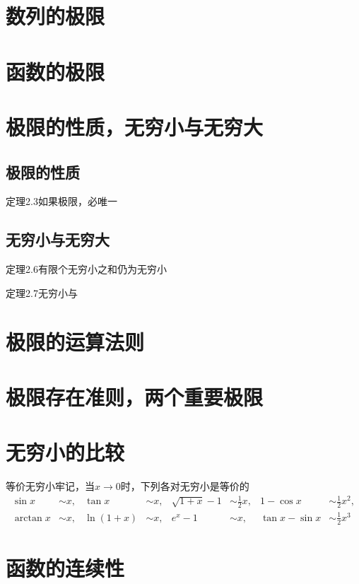 
\section{数列的极限}

\section{函数的极限}

\section{极限的性质，无穷小与无穷大}
\subsection{极限的性质}
定理2.3\quad 如果极限，必唯一

\subsection{无穷小与无穷大}
定理2.6\quad 有限个无穷小之和仍为无穷小

定理2.7\quad 无穷小与

\section{极限的运算法则}

\section{极限存在准则，两个重要极限}

\section{无穷小的比较}
等价无穷小\quad 牢记，当$x\to0$时，下列各对无穷小是等价的
\[
\begin{aligned}
\sin x &\sim x, & \tan x &\sim x, & \sqrt{1+x}-1 &\sim \frac12 x, & 1-\cos x &\sim \frac12 x^2,\\
\arctan x &\sim x, & \ln(1+x) &\sim x, & e^x-1 &\sim x, & \tan x-\sin x &\sim \frac12 x^3
\end{aligned}
\]

\section{函数的连续性}
